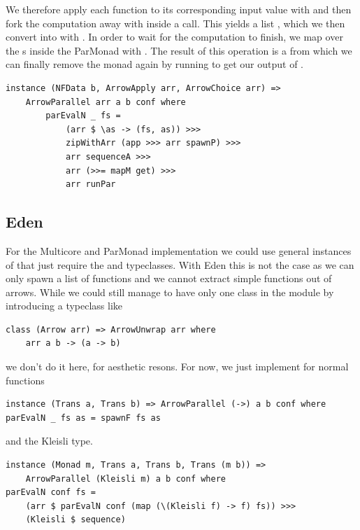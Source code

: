 We therefore apply each function to its corresponding input value with  and then fork the computation away with  inside a  call. This yields a list , which we then convert into  with . In order to wait for the computation to finish, we map over the s inside the ParMonad with . The result of this operation is a  from which we can finally remove the monad again by running  to get our output of \code{[b]}.
\begin{lstlisting}[frame=htrbl]
instance (NFData b, ArrowApply arr, ArrowChoice arr) =>
	ArrowParallel arr a b conf where
		parEvalN _ fs = 
			(arr $ \as -> (fs, as)) >>>
			zipWithArr (app >>> arr spawnP) >>>
			arr sequenceA >>>
			arr (>>= mapM get) >>>
			arr runPar
\end{lstlisting} %

\subsection{Eden}
For the Multicore and ParMonad implementation we could use general instances of  that just require the  and  typeclasses. With Eden this is not the case as we can only spawn a list of functions and we cannot extract simple functions out of arrows. While we could still manage to have only one class in the module by introducing a typeclass like
\begin{lstlisting}[frame=htrbl]
class (Arrow arr) => ArrowUnwrap arr where
	arr a b -> (a -> b)
\end{lstlisting} %
we don't do it here, for aesthetic resons. For now, we just implement  for normal functions
\begin{lstlisting}[frame=htrbl]
instance (Trans a, Trans b) => ArrowParallel (->) a b conf where
parEvalN _ fs as = spawnF fs as
\end{lstlisting}
and the Kleisli type.
\begin{lstlisting}[frame=htrbl]
instance (Monad m, Trans a, Trans b, Trans (m b)) =>
	ArrowParallel (Kleisli m) a b conf where
parEvalN conf fs =
	(arr $ parEvalN conf (map (\(Kleisli f) -> f) fs)) >>>
	(Kleisli $ sequence)
\end{lstlisting}

